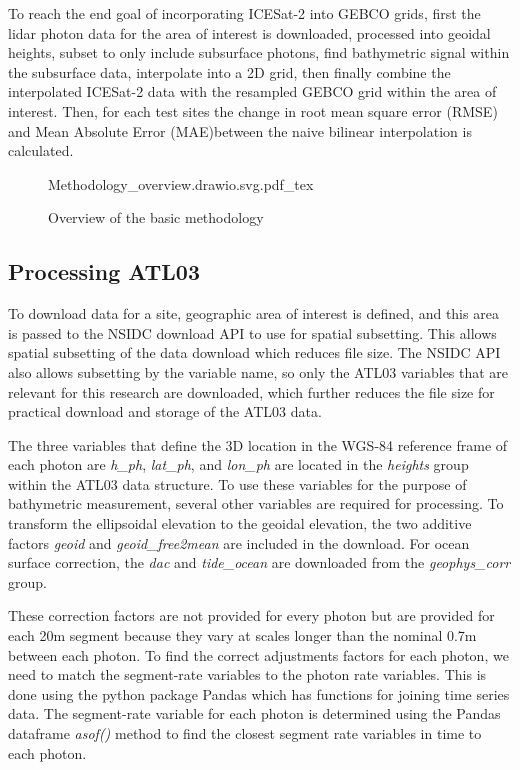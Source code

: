 To reach the end goal of incorporating ICESat-2 into GEBCO grids, first the lidar photon data for the area of interest is downloaded, processed into geoidal heights, subset to only include subsurface photons, find bathymetric signal within the subsurface data, interpolate into a 2D grid, then finally combine the interpolated ICESat-2 data with the resampled GEBCO grid within the area of interest. Then, for each test sites the change in root mean square error (RMSE) and Mean Absolute Error (MAE)between the naive bilinear interpolation is calculated. 

\begin{figure}[h]
    \centering
    {Methodology_overview.drawio.svg.pdf_tex}
    \caption{Overview of the basic methodology}
    \label{fig:methodology-overview}
\end{figure}

\subsection{Processing ATL03}
To download data for a site, geographic area of interest is defined, and this area is passed to the NSIDC download API to use for spatial subsetting. This allows spatial subsetting of the data download which reduces file size. The NSIDC API also allows subsetting by the variable name, so only the ATL03 variables that are relevant for this research are downloaded, which further reduces the file size for practical download and storage of the ATL03 data. 

The three variables that define the 3D location in the WGS-84 reference frame of each photon are \emph{h\_ph}, \emph{lat\_ph}, and \emph{lon\_ph} are located in the \emph{heights} group within the ATL03 data structure. To use these variables for the purpose of bathymetric measurement, several other variables are required for processing. To transform the ellipsoidal elevation to the geoidal elevation, the two additive factors \emph{geoid} and \emph{geoid\_free2mean} are included in the download. For ocean surface correction, the \emph{dac} and \emph{tide\_ocean} are downloaded from the \emph{geophys\_corr} group.

These correction factors are not provided for every photon but are provided for each 20m segment because they vary at scales longer than the nominal 0.7m between each photon. To find the correct adjustments factors for each photon, we need to match the segment-rate variables to the photon rate variables. This is done using the python package Pandas \parencite{jeff_reback_2022_6408044,mckinney-proc-scipy-2010} which has functions for joining time series data.  The segment-rate variable for each photon is determined using the Pandas dataframe \emph{asof()} method to find the closest segment rate variables in time to each photon. 


